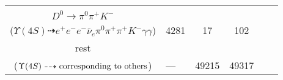 \documentclass[landscape]{article}
\newcounter{rownumbers}
\newcommand\rn{\stepcounter{rownumbers}\arabic{rownumbers}}
\newcommand{\EOL}{\\ \hline}
\newcommand{\topoTags}[1]{#1}
\begin{document}
\begin{longtable}{|c|l|c|c|c|c|}
\rn & \makecell[l]{ $ 
\Upsilon(4S) \rightarrow \bar{B}^{0} \bar{B}^{0} ,
\bar{B}^{0} \rightarrow \eta J/\psi ,
\bar{B}^{0} \rightarrow e^{-} \bar{\nu}_{e} D^{*+} ,
\eta \rightarrow \gamma \gamma ,
J/\psi \rightarrow e^{+} e^{-} ,
D^{*+} \rightarrow \pi^{+} D^{0} ,
$ \\ $
D^{0} \rightarrow \pi^{0} \pi^{+} K^{-} 
$ \\ ($
\Upsilon(4S) \dashrightarrow e^{+} e^{-} e^{-} \bar{\nu}_{e} \pi^{0} \pi^{+} \pi^{+} K^{-} \gamma \gamma 
$) } & \topoTags{4281 & }17 & 102 \EOL

rest & \makecell[l]{ $ 
\Upsilon(4S) \rightarrow \rm{others \  (44978 \  in \  total)}
$ \\ ($
\Upsilon(4S) \dashrightarrow \rm{corresponding\ to\ others}
$) } & \topoTags{--- & }49215 & 49317 \EOL

\end{longtable}
\end{document}
